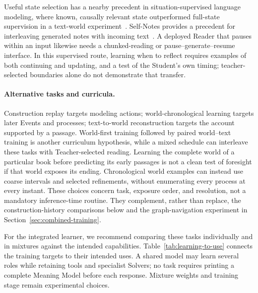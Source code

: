 \documentclass[10pt]{article}
\begin{document}
Useful state selection has a nearby precedent in situation-supervised language
modeling, where known, causally relevant state outperformed full-state
supervision in a text-world experiment~\cite{li2023situations}. Self-Notes
provides a precedent for interleaving generated notes with incoming
text~\cite{lanchantin2023selfnotes}. A deployed Reader that pauses within an
input likewise needs a chunked-reading or pause--generate--resume interface.
In this supervised route, learning when to reflect requires examples of both continuing and updating,
and a test of the Student's own timing; teacher-selected boundaries alone do
not demonstrate that transfer.

\paragraph{Alternative tasks and curricula.}
Construction replay targets modeling actions; world-chronological learning
targets later Events and processes; text-to-world reconstruction targets the
account supported by a passage. World-first training followed by paired
world--text training is another curriculum hypothesis, while a mixed schedule
can interleave these tasks with Teacher-selected reading. Learning the complete
world of a particular book before predicting its early passages is not a clean
test of foresight if that world exposes its ending. Chronological world
examples can instead use coarse intervals and selected refinements, without
enumerating every process at every instant. These choices concern task,
exposure order, and resolution, not a mandatory inference-time routine.
They complement, rather than replace, the construction-history comparisons
below and the graph-navigation experiment in
Section~\ref{sec:combined-training}.

For the integrated learner, we recommend comparing these tasks individually
and in mixtures against the intended capabilities. Table~\ref{tab:learning-to-use}
connects the training targets to their intended uses. A shared model may learn
several roles while retaining tools and specialist Solvers; no task requires
printing a complete Meaning Model before each response. Mixture weights and
training stage remain experimental choices.
\end{document}
